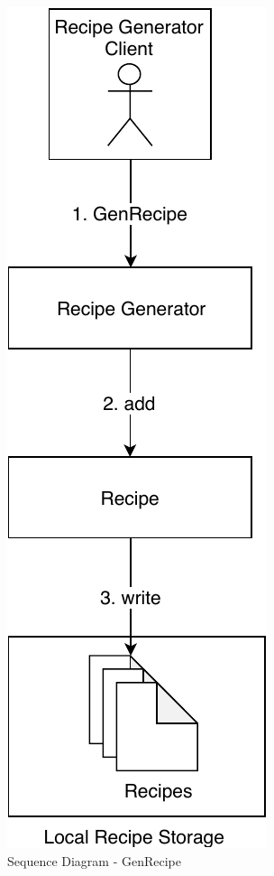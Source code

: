 \begin{figure}[ht]
	\centering
  \includegraphics[height=0.6\textheight]{img/SequenceDiagram-GenRecipe.pdf}
	\caption{Sequence Diagram - GenRecipe}
	\label{fig:SequenceDiagram-GenRecipe}
\end{figure}

